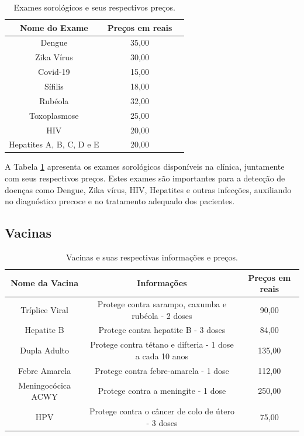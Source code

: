 \documentclass{article}
\begin{document}
        \vspace{10mm}
        \begin{table}[H]
            \centering
            \caption{Exames sorológicos e seus respectivos preços.}
            \label{tab:exames sorológicos}
            \begin{tabular}{|c|c|c|}
            \hline
            Nome do Exame & Preços em reais \\
            \hline
            Dengue & 35,00\\
            \hline
            Zika Vírus & 30,00 \\
            \hline
            Covid-19 & 15,00 \\
            \hline
            Sífilis & 18,00 \\
            \hline
            Rubéola & 32,00 \\
            \hline
            Toxoplasmose & 25,00 \\
            \hline
            HIV & 20,00 \\
            \hline
            Hepatites A, B, C, D e E & 20,00 \\
            \hline
            \end{tabular}
        \end{table}

        A Tabela \ref{tab:exames sorológicos} apresenta os exames sorológicos disponíveis na clínica, juntamente com seus respectivos preços. Estes exames são importantes para a detecção de doenças como Dengue, Zika vírus, HIV, Hepatites e outras infecções, auxiliando no diagnóstico precoce e no tratamento adequado dos pacientes.

    \subsection{Vacinas}
        \begin{table}[H]
            \centering
            \caption{Vacinas e suas respectivas informações e preços.}
            \label{tab:vacinas}
            \begin{tabular}{|c|c|c|}
            \hline
            Nome da Vacina & Informações & Preços em reais \\
            \hline
            Tríplice Viral & Protege contra sarampo, caxumba e rubéola - 2 doses & 90,00\\
            \hline
            Hepatite B & Protege contra hepatite B - 3 doses & 84,00 \\
            \hline
            Dupla Adulto & Protege contra tétano e difteria - 1 dose a cada 10 anos & 135,00 \\
            \hline
            Febre Amarela & Protege contra febre-amarela - 1 dose & 112,00 \\
            \hline
            Meningocócica ACWY & Protege contra a meningite - 1 dose & 250,00 \\
            \hline
            HPV & Protege contra o câncer de colo de útero - 3 doses & 75,00 \\
            \hline
            \end{tabular}
        \end{table}
\end{document}
